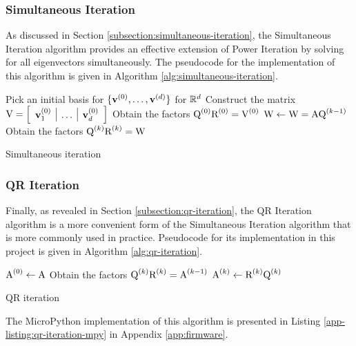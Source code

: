 \subsubsection{Simultaneous Iteration}
As discussed in Section \ref{subsection:simultaneous-iteration}, the Simultaneous Iteration algorithm provides an effective extension of Power Iteration by solving for all eigenvectors simultaneously. The pseudocode for the implementation of this algorithm is given in Algorithm \ref{alg:simultaneous-iteration}.
\begin{algorithm}
\begin{algorithmic}
\State Pick an initial basis for $\{{\mathbf{v}}^{(0)}, \dots, {\mathbf{v}}^{(d)} \}$ for $\mathbb{R}^d$
\State Construct the matrix ${\textrm{V}} = \left[\begin{array}{l|l|l}{\mathbf{v}}_1^{(0)} & \dots & {\mathbf{v}}_d^{(0)}\end{array}\right]$
\State Obtain the factors ${\textrm{Q}}^{(0)}{\textrm{R}}^{(0)} = {\textrm{V}}^{(0)}$ 
{}
    \State ${\textrm{W}} \gets {\textrm{W}} = {\textrm{A}}{\textrm{Q}}^{(k-1)}$
    \State Obtain the factors ${\textrm{Q}}^{(k)}{\textrm{R}}^{(k)} = {\textrm{W}}$ 
\EndFor
\end{algorithmic}
\caption{Simultaneous iteration}
\label{alg:simultaneous-iteration}
\end{algorithm}

\subsubsection{QR Iteration}
Finally, as revealed in Section \ref{subsection:qr-iteration}, the QR Iteration algorithm is a more convenient form of the Simultaneous Iteration algorithm that is more commonly used in practice. Pseudocode for its implementation in this project is given in Algorithm \ref{alg:qr-iteration}.
\begin{algorithm}
\begin{algorithmic}
\State ${\textrm{A}}^{(0)} \gets {\textrm{A}}$
    \State Obtain the factors ${\textrm{Q}}^{(k)}{\textrm{R}}^{(k)} = {\textrm{A}}^{(k-1)}$ 
    \State ${\textrm{A}}^{(k)} \gets {\textrm{R}}^{(k)}{\textrm{Q}}^{(k)}$ 
\EndFor
\end{algorithmic}
\caption{QR iteration}
\label{alg:qr-iteration}
\end{algorithm}
The MicroPython implementation of this algorithm is presented in Listing \ref{app-listing:qr-iteration-mpy} in Appendix \ref{app:firmware}.

